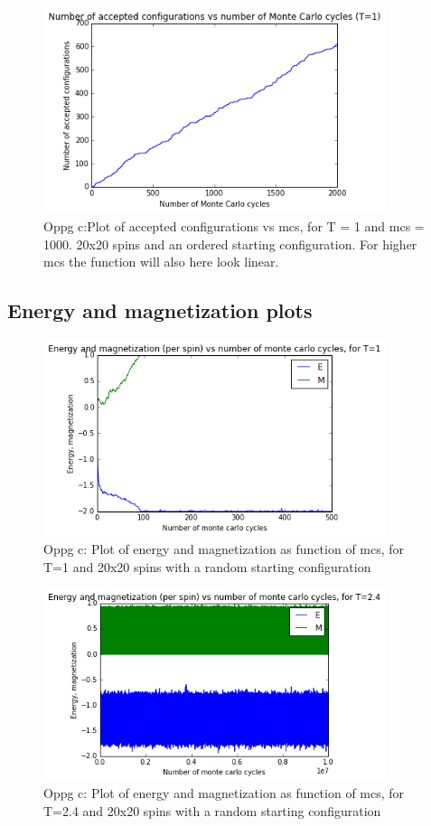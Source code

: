 \documentclass[twocolumn]{article}
\begin{document}
\begin{figure}[h!]
  \centering
  \caption{Oppg c:Plot of accepted configurations vs mcs, for T = 1 and mcs = 1000. 20x20 spins and an ordered starting configuration. For higher mcs the function will also here look linear.}
  \includegraphics[width=10cm]{configs_plot_4.png}
\end{figure}

\newpage

\newpage

\newpage

\centering\subsection{Energy and magnetization plots}

\begin{figure}[h!]
  \centering
  \caption{Oppg c: Plot of energy and magnetization as function of mcs, for T=1 and 20x20 spins with a random starting configuration}
  \includegraphics[width=10cm]{E_M_plot_c_1.png}
\end{figure}

\begin{figure}[h!]
  \centering
  \caption{Oppg c: Plot of energy and magnetization as function of mcs, for T=2.4 and 20x20 spins with a random starting configuration}
  \includegraphics[width=10cm]{E_M_plot_c_2.png}
\end{figure}
\end{document}
